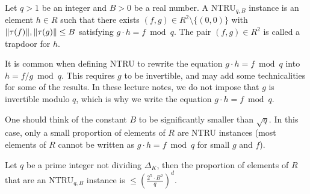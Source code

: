 \begin{definition}
Let $q >1$ be an integer and $B >0$ be a real number. A NTRU$_{q,B}$ instance is an element $h \in R$ such that there exists $(f,g) \in R^2\setminus \{(0,0)\}$ with $\|\tau(f)\|, \|\tau(g)\| \leq B$ satisfying $g \cdot h = f \bmod q$. The pair $(f,g) \in R^2$ is called a trapdoor for $h$.
\end{definition}

It is common when defining NTRU to rewrite the equation $g \cdot h = f \bmod q$ into $h = f/g \bmod q$. This requires $g$ to be invertible, and may add some technicalities for some of the results. In these lecture notes, we do not impose that $g$ is invertible modulo $q$, which is why we write the equation $g \cdot h = f \bmod q$.

One should think of the constant $B$ to be significantly smaller than $\sqrt{q}$. In this case, only a small proportion of elements of $R$ are NTRU instances (most elements of $R$ cannot be written as $g \cdot h = f \bmod q$ for small $g$ and $f$).

\begin{lemma}
Let $q$ be a prime integer not dividing $\Delta_K$, then the proportion of elements of $R$ that are an NTRU$_{q,B}$ instance is $\leq \left( \frac{2^5 \cdot B^2}{q}\right)^d$.
\end{lemma}

